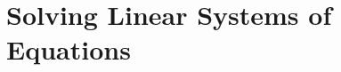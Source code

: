\documentclass[../fem.tex]{subfile}
\begin{document}
\section{Solving Linear Systems of Equations}%
\label{sec:solving_linear_systems_of_equations}
\end{document}
